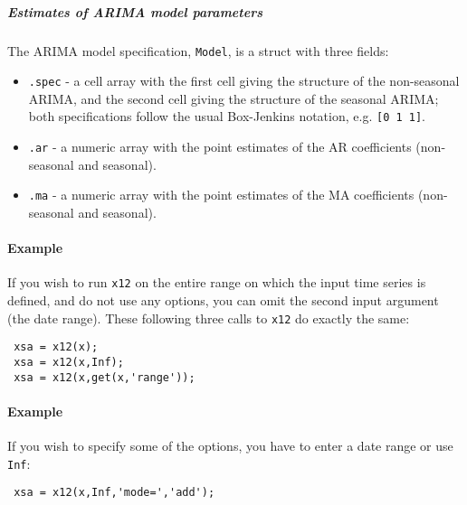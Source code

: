  \subparagraph{Estimates of ARIMA model parameters}
 
 The ARIMA model specification, \texttt{Model}, is a struct with three
 fields:
 
 \begin{itemize}
 \item
   \texttt{.spec} - a cell array with the first cell giving the structure
   of the non-seasonal ARIMA, and the second cell giving the structure of
   the seasonal ARIMA; both specifications follow the usual Box-Jenkins
   notation, e.g. \texttt{{[}0 1 1{]}}.
 \item
   \texttt{.ar} - a numeric array with the point estimates of the AR
   coefficients (non-seasonal and seasonal).
 \item
   \texttt{.ma} - a numeric array with the point estimates of the MA
   coefficients (non-seasonal and seasonal).
 \end{itemize}
 
 \paragraph{Example}
 
 If you wish to run \texttt{x12} on the entire range on which the input
 time series is defined, and do not use any options, you can omit the
 second input argument (the date range). These following three calls to
 \texttt{x12} do exactly the same:
 
 \begin{verbatim}
 xsa = x12(x);
 xsa = x12(x,Inf);
 xsa = x12(x,get(x,'range'));
 \end{verbatim}
 
 \paragraph{Example}
 
 If you wish to specify some of the options, you have to enter a date
 range or use \texttt{Inf}:
 
 \begin{verbatim}
 xsa = x12(x,Inf,'mode=','add');
 \end{verbatim}


